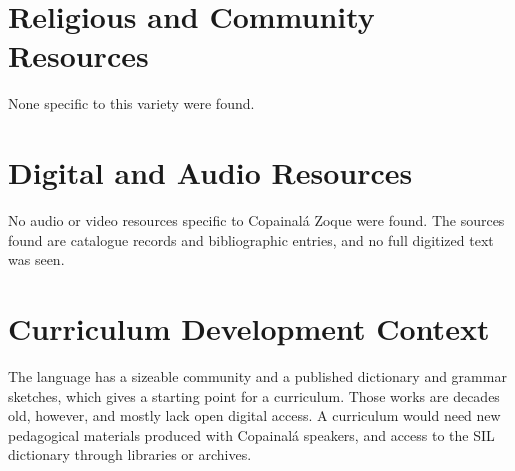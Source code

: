 \documentclass[12pt]{article}
\begin{document}
\section{Religious and Community Resources}
None specific to this variety were found.

\section{Digital and Audio Resources}
No audio or video resources specific to Copainal\'a Zoque were found. The sources found are catalogue records and bibliographic entries, and no full digitized text was seen.

\section{Curriculum Development Context}
The language has a sizeable community and a published dictionary and grammar sketches, which gives a starting point for a curriculum. Those works are decades old, however, and mostly lack open digital access. A curriculum would need new pedagogical materials produced with Copainal\'a speakers, and access to the SIL dictionary through libraries or archives.
\end{document}
